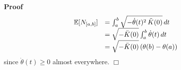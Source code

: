 \documentclass{article}
\newenvironment{proof}{\noindent\textbf{Proof\ }}{\hspace*{\fill}$\Box$\medskip}
\begin{document}
\begin{proof}
\begin{equation}
\begin{array}{ll}
      \mathbb{E} [N_{[a, b]}] & = \int_a^b \sqrt{- \dot{\theta} (t)^2 
      \hspace{0.17em} \ddot{K} (0)}  \hspace{0.17em} dt\\
      & = \sqrt{- \ddot{K} (0)}  \int_a^b \dot{\theta} (t)  \hspace{0.17em}
      dt\\
      & = \sqrt{- \ddot{K} (0)}  \hspace{0.17em} (\theta (b) - \theta (a))
    \end{array}
  \end{equation}
  since $\dot{\theta} (t) \geq 0$ almost everywhere.
\end{proof}
\end{document}
